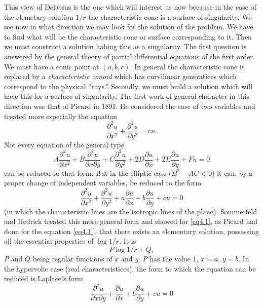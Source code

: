\documentclass[12pt,oneside]{book}
\begin{document}
This view of Delassus is the one which will interest us now because in the case of the elemetary solution $1/r$ the characteristic cone is a surface of singularity. We see now in what direction we may look for the solution of the problem. We have to find what will be the characteristic cone or surface corresponding to it. Then we must construct a solution habing this as a singularity. The first question is answered by the general theory of partial differential equations of the first order. We must have a conic point at $(a,b,c)$. In general the characteristic cone is replaced by a \textit{characteristic conoid} which has curvilinear generatices which correspond to the physical ``rays.'' Secondly, we must build a solution which will have this for a surface of singularity. The first work of general character in this direction was that of Picard in 1891. He considered the case of two variables and treated more especially the equation
\begin{equation}
    \tag{4.1'}
    \label{eq4.1'}
    \frac{\partial^2 u}{\partial x^2}+\frac{\partial^2u}{\partial y^2}=cu.
\end{equation}
Not every equation of the general type
\begin{equation*}
    A\frac{\partial^2u}{\partial x^2}+B\frac{\partial^2u}{\partial x\partial y}+C\frac{\partial^2u}{\partial y^2}+2D\frac{\partial u}{\partial x}+2E\frac{\partial u}{\partial y}+Fu=0
\end{equation*}
can be reduced to that form. But in the elliptic case ($B^2-AC<0$) it can, by a proper change of independent variables, be reduced to the form
\begin{equation}
    \frac{\partial^2u}{\partial x^2}+\frac{\partial^2u}{\partial y^2}+a\frac{\partial u}{\partial x}+b\frac{\partial u}{\partial y}+cu=0
    \label{eq4.1}
\end{equation}
(in which the characteristic lines are the isotropic lines of the plane). Sommerfeld and Hedrick treated this more general form and showed for \eqref{eq4.1}, as Picard had done for the equation \eqref{eq4.1'}, that there exists an elementary solution, possessing all the essential properties of $\log 1/r$. It is
$$ P\log 1/r+Q,$$
$P$ and $Q$ being regular functions of $x$ and $y$. $P$ has the value 1, $x=a,\, y=b$. In the hypervolic case (real characteristices), the form to which the equation can be reduced is Laplace's form
\begin{equation}
    \frac{\partial^2u}{\partial x\partial y}+\frac{\partial u}{\partial x}+b\frac{\partial u}{\partial y}+cu=0
    \label{eq4.2}
\end{equation}
\end{document}
